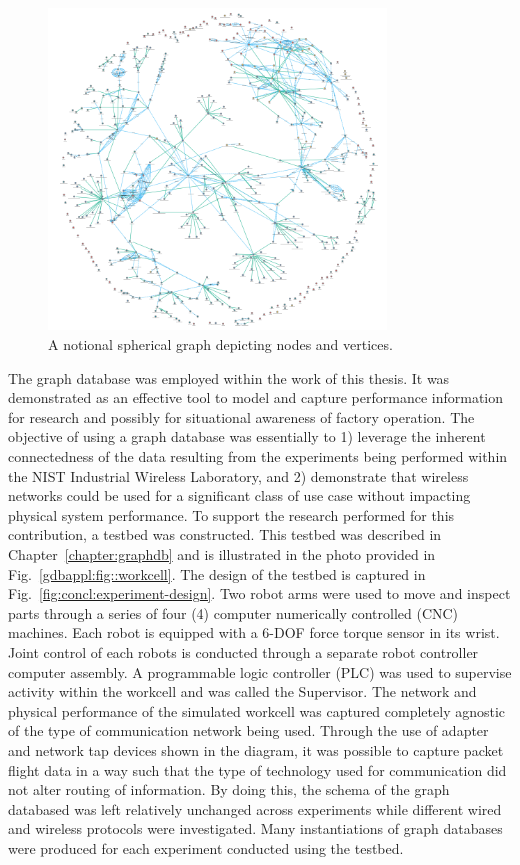 \begin{figure}[!ht]
	\centering
	\includegraphics[width=0.8\textwidth]{chapter-conclusions/images/spherical-graph.png}
	\caption{A notional spherical graph depicting nodes and vertices.}
	\label{fig:concl:graphdb-sperical}
\end{figure}

The graph database was employed within the work of this thesis.  It was demonstrated as an effective tool to model and capture performance information for research and possibly for situational awareness of factory operation.  The objective of using a graph database was essentially to 1) leverage the inherent connectedness of the data resulting from the experiments being performed within the NIST Industrial Wireless Laboratory, and 2) demonstrate that wireless networks could be used for a significant class of use case without impacting physical system performance. To support the research performed for this contribution, a testbed was constructed. This testbed was described in Chapter~\ref{chapter:graphdb} and is illustrated in the photo provided in Fig.~\ref{gdbappl:fig::workcell}.  The design of the testbed is captured in Fig.~\ref{fig:concl:experiment-design}.  Two robot arms were used to move and inspect parts through a series of four (4) computer numerically controlled (CNC) machines.  Each robot is equipped with a 6-DOF force torque sensor in its wrist.  Joint control of each robots is conducted through a separate robot controller computer assembly.  A programmable logic controller (PLC) was used to supervise activity within the workcell and was called the Supervisor.  The network and physical performance of the simulated workcell was captured completely agnostic of the type of communication network being used.  Through the use of adapter and network tap devices shown in the diagram, it was possible to capture packet flight data in a way such that the type of technology used for communication did not alter routing of information.  By doing this, the schema of the graph databased was left relatively unchanged across experiments while different wired and wireless protocols were investigated. Many instantiations of graph databases were produced for each experiment conducted using the testbed.  

